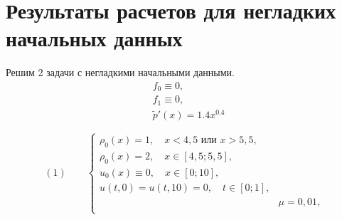 \documentclass[a4paper, 11pt]{article}
\begin{document}
\section{Результаты расчетов для негладких начальных данных}
Решим 2 задачи с негладкими начальными данными.
\begin{equation}
\begin{split}
& f_0 \equiv  0, \\
& f_1  \equiv 0, \\
& \tilde{p}' (x) = 1.4x^{0.4}
\end{split}
\end{equation}

$$
(1)\quad \quad
\begin{cases}
\rho_0(x) = 1, \quad x < 4,5 \text{ или } x > 5,5,\\
\rho_0(x) = 2, \quad x \in [4,5; 5,5],\\
u_0(x) \equiv 0, \quad x \in [0; 10],\\
u(t, 0) = u(t, 10) = 0, \quad t \in [0; 1], \\
& \mu =  0,01, \\
\end{cases}
$$
\end{document}

